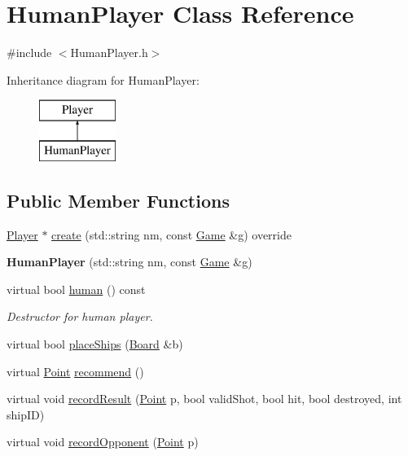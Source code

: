 \hypertarget{class_human_player}{}\section{Human\+Player Class Reference}
\label{class_human_player}


{\ttfamily \#include $<$Human\+Player.\+h$>$}

Inheritance diagram for Human\+Player\+:\begin{figure}[H]
\begin{center}
\leavevmode
\includegraphics[height=2.000000cm]{class_human_player}
\end{center}
\end{figure}
\subsection*{Public Member Functions}
\begin{DoxyCompactItemize}
\item 
\mbox{\hyperlink{class_player}{Player}} $\ast$ \mbox{\hyperlink{class_human_player_acc99520ffa6b0a1885d081fde6f2297b}{create}} (std\+::string nm, const \mbox{\hyperlink{class_game}{Game}} \&g) override
\item 
\mbox{\label{class_human_player_a443ff25b201959966555c0902a10e19c}} 
{\bfseries Human\+Player} (std\+::string nm, const \mbox{\hyperlink{class_game}{Game}} \&g)
\item 
\mbox{\label{class_human_player_acecbe621447504a013c2a763aaba05fa}} 
virtual bool \mbox{\hyperlink{class_human_player_acecbe621447504a013c2a763aaba05fa}{human}} () const
\begin{DoxyCompactList}\small\item\em Destructor for human player. \end{DoxyCompactList}\item 
virtual bool \mbox{\hyperlink{class_human_player_ae9315a3c66f6b2f2bf4d1ebb09669aff}{place\+Ships}} (\mbox{\hyperlink{class_board}{Board}} \&b)
\item 
virtual \mbox{\hyperlink{class_point}{Point}} \mbox{\hyperlink{class_human_player_a718f16f3ddeeb34c9f2e93cf1d805b46}{recommend}} ()
\item 
virtual void \mbox{\hyperlink{class_human_player_a19be81244b7a1c88a3ca89d207055b6e}{record\+Result}} (\mbox{\hyperlink{class_point}{Point}} p, bool valid\+Shot, bool hit, bool destroyed, int ship\+ID)
\item 
virtual void \mbox{\hyperlink{class_human_player_a16b18f42e02d7c8d1f0971ce5e91595f}{record\+Opponent}} (\mbox{\hyperlink{class_point}{Point}} p)
\end{DoxyCompactItemize}


